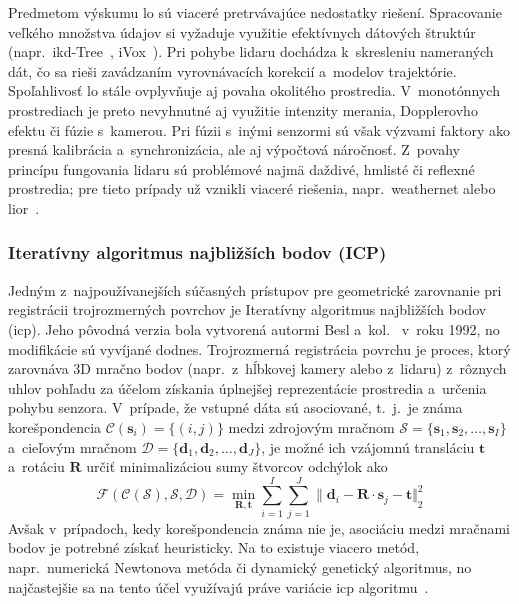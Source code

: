      Predmetom výskumu \acrshort{lo} sú viaceré pretrvávajúce nedostatky riešení. Spracovanie veľkého množstva údajov si vyžaduje využitie efektívnych dátových štruktúr (napr.\ ikd-Tree~\cite{caiIkdTreeIncrementalKD2021}, iVox~\cite{baiFasterLIOLightweightTightly2022}). Pri pohybe lidaru dochádza k~skresleniu nameraných dát, čo sa rieši zavádzaním vyrovnávacích korekcií a~modelov trajektórie. Spoľahlivosť \acrshort{lo} stále ovplyvňuje aj povaha okolitého prostredia. V~monotónnych prostrediach je preto nevyhnutné aj využitie intenzity merania, Dopplerovho efektu či fúzie s~kamerou. Pri fúzii s~inými senzormi sú však výzvami faktory ako presná kalibrácia a~synchronizácia, ale aj výpočtová náročnosť. Z~povahy princípu fungovania lidaru sú problémové najmä daždivé, hmlisté či reflexné prostredia; pre tieto prípady už vznikli viaceré riešenia, napr.\ \acrshort{weathernet} alebo \acrshort{lior}~\cite{leeLiDAROdometrySurvey2024}.

    \subsubsection{Iteratívny algoritmus najbližších bodov (ICP)}\label{ssec:icp}

      Jedným z~najpoužívanejších súčasných prístupov pre geometrické zarovnanie pri registrácii trojrozmerných povrchov je Iteratívny algoritmus najbližších bodov (\acrshort{icp}). Jeho pôvodná verzia bola vytvorená autormi Besl a~kol.~\cite{beslMethodRegistration3D1992} v~roku 1992, no modifikácie sú vyvíjané dodnes. Trojrozmerná registrácia povrchu je proces, ktorý zarovnáva 3D mračno bodov (napr.\ z~hĺbkovej kamery alebo z~lidaru) z~rôznych uhlov pohľadu za účelom získania úplnejšej reprezentácie prostredia a~určenia pohybu senzora. V~prípade, že vstupné dáta sú asociované, t.\ j.\ je známa korešpondencia $\mathcal{C} (\bm{s}_i) = \{ (i,j) \} $ medzi zdrojovým mračnom $ \mathcal{S} = \{ \bm{s}_1, \bm{s}_2,\dots,\bm{s}_I\}$ a~cieľovým mračnom $\mathcal{D} = \{ \bm{d}_1, \bm{d}_2,\dots,\bm{d}_J \}$, je možné ich vzájomnú transláciu $\bm{t}$ a~rotáciu $\bm{R}$ určiť minimalizáciou sumy štvorcov odchýlok ako
      \begin{equation}
        \mathcal{F} (\mathcal{C}(\mathcal{S}),\mathcal{S},\mathcal{D}) = \min_{\bm{R},\bm{t}} \sum_{i=1}^{I} \sum_{j=1}^{J} {\| \bm{d}_i - \bm{R} \cdot \bm{s}_j - \bm{t} \Vert}^2_2
      \end{equation}
      Avšak v~prípadoch, kedy korešpondencia známa nie je, asociáciu medzi mračnami bodov je potrebné  získať heuristicky. Na to existuje viacero metód, napr.\ numerická Newtonova metóda či dynamický genetický algoritmus, no najčastejšie sa na tento účel využívajú práve variácie \acrshort{icp} algoritmu~\cite{baiICPAlgorithmTheory2023}.

